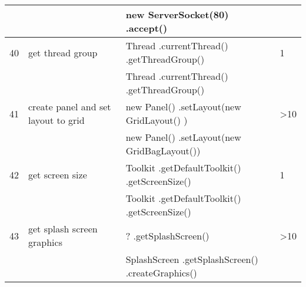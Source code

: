 \begin{longtable}{|p{}|p{}|p{}|p{}|}
		\rowcolor[HTML]{9AFF99} 
		&                                                        & new ServerSocket(80) .accept()                                                                                   &                                         \\ \hline
		\rowcolor[HTML]{FFCCC9} 
		40                                & get thread group                                       & Thread .currentThread() .getThreadGroup()                                                                        & 1                                       \\ \hline
		\rowcolor[HTML]{9AFF99} 
		&                                                        & Thread .currentThread() .getThreadGroup()                                                                        &                                         \\ \hline
		\rowcolor[HTML]{FFCCC9} 
		41                                & create panel and set layout to grid                    & new Panel()  .setLayout(new GridLayout() )                                                                       & \textgreater{}10                        \\ \hline
		\rowcolor[HTML]{9AFF99} 
		&                                                        & new Panel() .setLayout(new GridBagLayout())                                                                      &                                         \\ \hline
		\rowcolor[HTML]{FFCCC9} 
		42                                & get screen size                                        & Toolkit .getDefaultToolkit() .getScreenSize()                                                                    & 1                                       \\ \hline
		\rowcolor[HTML]{9AFF99} 
		&                                                        & Toolkit .getDefaultToolkit() .getScreenSize()                                                                    &                                         \\ \hline
		\rowcolor[HTML]{FFCCC9} 
		43                                & get splash screen graphics                             & ? .getSplashScreen()                                                                                             & \textgreater{}10                        \\ \hline
		\rowcolor[HTML]{9AFF99} 
		&                                                        & SplashScreen .getSplashScreen() .createGraphics()                                                                &                                         \\ \hline

\end{longtable}

